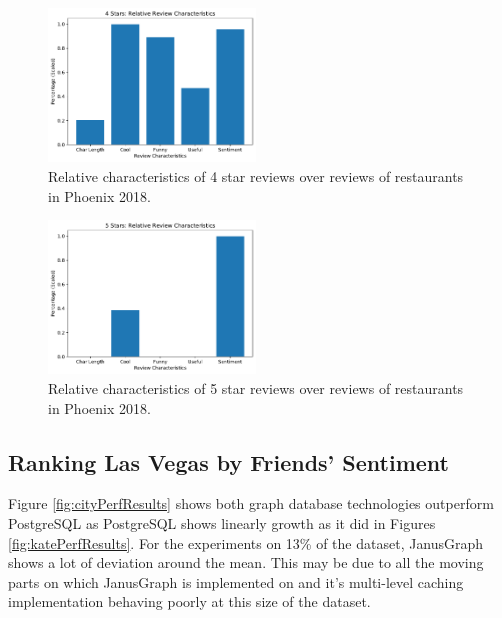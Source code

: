 \begin{figure}[h]
    \centering
    \includegraphics[width=0.49\textwidth]{img/phoenix2018/4Stars.pdf}
    \caption{Relative characteristics of 4 star reviews over reviews of restaurants in Phoenix 2018.}
    \label{fig:4star}
\end{figure}

\begin{figure}[h]
    \centering
    \includegraphics[width=0.49\textwidth]{img/phoenix2018/5Stars.pdf}
    \caption{Relative characteristics of 5 star reviews over reviews of restaurants in Phoenix 2018.}
    \label{fig:5star}
\end{figure}

\subsection{Ranking Las Vegas by Friends' Sentiment}

Figure \ref{fig:cityPerfResults} shows both graph database technologies outperform PostgreSQL as PostgreSQL shows linearly growth as it did in Figures \ref{fig:katePerfResults}. For the experiments on 13\% of the dataset, JanusGraph shows a lot of deviation around the mean. This may be due to all the moving parts on which JanusGraph is implemented on and it's multi-level caching implementation behaving poorly at this size of the dataset.

